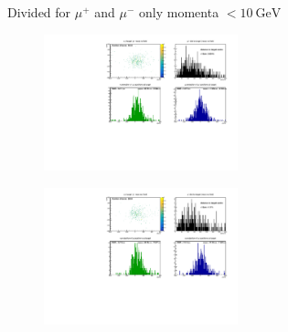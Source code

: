 \begin{frame}[t]{Divided for $\mu^+$ and $\mu^-$ only momenta $< \SI{10}{\giga\electronvolt}$}
  \begin{multicols}{2}
    \begin{figure}
      \centering
      \includegraphics[width=0.5\textwidth]{../hists/nofield/p/target_dist_amu.pdf}
    \end{figure}
    \columnbreak
    \begin{figure}
      \centering
      \includegraphics[width=0.5\textwidth]{../hists/nofield/p/target_dist_mu.pdf}
    \end{figure}
  \end{multicols}
\end{frame}

